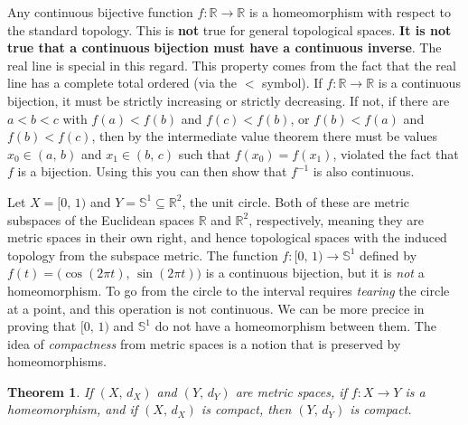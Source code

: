 \documentclass{article}
\theoremstyle{plain}
\newtheorem{theorem}{Theorem}[section]
\theoremstyle{normal}
\newenvironment{example}{%
    \pushQED{\qed}\renewcommand{\qedsymbol}{$\blacksquare$}\examplex%
}{%
    \popQED\endexamplex%
}
\begin{document}
        \begin{example}
            Any continuous bijective function
            $f:\mathbb{R}\rightarrow\mathbb{R}$ is a homeomorphism with respect
            to the standard topology. This is \textbf{not} true for general
            topological spaces. \textbf{It is not true that a continuous}
            \textbf{bijection must have a continuous inverse}. The real line is
            special in this regard. This property comes from the fact that the
            real line has a complete total ordered (via the $<$ symbol). If
            $f:\mathbb{R}\rightarrow\mathbb{R}$ is a continuous bijection, it
            must be strictly increasing or strictly decreasing. If not, if
            there are $a<b<c$ with $f(a)<f(b)$ and $f(c)<f(b)$, or
            $f(b)<f(a)$ and $f(b)<f(c)$, then by the intermediate value theorem
            there must be values $x_{0}\in(a,\,b)$ and $x_{1}\in(b,\,c)$ such
            that $f(x_{0})=f(x_{1})$, violated the fact that $f$ is a
            bijection. Using this you can then show that $f^{-1}$ is also
            continuous.
        \end{example}
        \begin{example}
            Let $X=[0,\,1)$ and $Y=\mathbb{S}^{1}\subseteq\mathbb{R}^{2}$, the
            unit circle. Both of these are metric subspaces of the Euclidean
            spaces $\mathbb{R}$ and $\mathbb{R}^{2}$, respectively, meaning they
            are metric spaces in their own right, and hence topological spaces
            with the induced topology from the subspace metric. The function
            $f:[0,\,1)\rightarrow\mathbb{S}^{1}$ defined by
            $f(t)=\big(\cos(2\pi{t}),\,\sin(2\pi{t})\big)$ is a continuous
            bijection, but it is \textit{not} a homeomorphism. To go from the
            circle to the interval requires \textit{tearing} the circle at a
            point, and this operation is not continuous.
        \end{example}
        We can be more precice in proving that $[0,\,1)$ and $\mathbb{S}^{1}$
        do not have a homeomorphism between them. The idea of
        \textit{compactness} from metric spaces is a notion that is preserved
        by homeomorphisms.
        \begin{theorem}
            If $(X,\,d_{X})$ and $(Y,\,d_{Y})$ are metric spaces, if
            $f:X\rightarrow{Y}$ is a homeomorphism, and if $(X,\,d_{X})$ is
            compact, then $(Y,\,d_{Y})$ is compact.
        \end{theorem}
\end{document}
